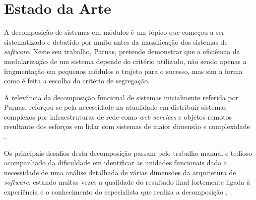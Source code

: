 


 

\chapter{Estado da Arte}
    
    A decomposição de sistemas em módulos é um tópico que começou a ser sistematizado e debatido por \cite{parnas72_decomposing_systems} muito antes da massificação dos sistemas de \textit{software}. Neste seu trabalho, Parnas, pretende demonstrar que a eficiência da modularização de um sistema depende do critério utilizado, não sendo apenas a fragmentação em pequenos módulos o trajeto para o sucesso, mas sim a forma como é feita a escolha do critério de segregação. 
    
   
    A relevância da decomposição funcional de sistemas inicialmente referida por Parnas, reforçou-se pela necessidade na atualidade em distribuir sistemas complexos por infraestruturas de rede como \textit{web services} e objetos remotos resultante dos esforços em lidar com sistemas de maior dimensão e complexidade \citep{kamimura18_city_analogy}. 
    
    Os principais desafios desta decomposição passam pelo trabalho manual e tedioso acompanhado da dificuldade em identificar as unidades funcionais dada a necessidade de uma análise detalhada de várias dimensões da arquitetura de \textit{software}, estando muitas vezes a qualidade do resultado final fortemente ligada à experiência e o conhecimento do especialista que realiza a decomposição \citep{kamimura18_city_analogy, pahl16_ms_systematic_mapping}. 
    


